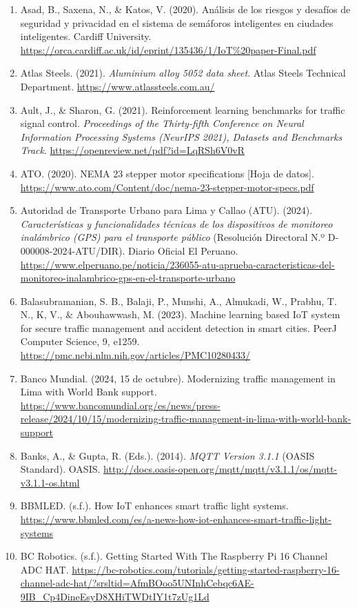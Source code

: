 \begin{enumerate}
\item
  Asad, B., Saxena, N., \& Katos, V. (2020). Análisis de los riesgos y desafíos de seguridad y privacidad en el sistema de semáforos inteligentes en ciudades inteligentes. Cardiff University. \url{https://orca.cardiff.ac.uk/id/eprint/135436/1/IoT%20paper-Final.pdf}
\item
  Atlas Steels. (2021). \emph{Aluminium alloy 5052 data sheet}. Atlas Steels Technical Department. \url{https://www.atlassteels.com.au/}
\item
  Ault, J., \& Sharon, G. (2021). Reinforcement learning benchmarks for traffic signal control. \emph{Proceedings of the Thirty-fifth Conference on Neural Information Processing Systems (NeurIPS 2021), Datasets and Benchmarks Track}. \url{https://openreview.net/pdf?id=LqRSh6V0vR}
\item
  ATO. (2020). NEMA 23 stepper motor specifications {[}Hoja de datos{]}. \url{https://www.ato.com/Content/doc/nema-23-stepper-motor-specs.pdf}
\item
  Autoridad de Transporte Urbano para Lima y Callao (ATU). (2024). \emph{Características y funcionalidades técnicas de los dispositivos de monitoreo inalámbrico (GPS) para el transporte público} (Resolución Directoral N.º D-000008-2024-ATU/DIR). Diario Oficial El Peruano. \url{https://www.elperuano.pe/noticia/236055-atu-aprueba-caracteristicas-del-monitoreo-inalambrico-gps-en-el-transporte-urbano}
\item
  Balasubramanian, S. B., Balaji, P., Munshi, A., Almukadi, W., Prabhu, T. N., K, V., \& Abouhawwash, M. (2023). Machine learning based IoT system for secure traffic management and accident detection in smart cities. PeerJ Computer Science, 9, e1259. \url{https://pmc.ncbi.nlm.nih.gov/articles/PMC10280433/}
\item
  Banco Mundial. (2024, 15 de octubre). Modernizing traffic management in Lima with World Bank support. \url{https://www.bancomundial.org/es/news/press-release/2024/10/15/modernizing-traffic-management-in-lima-with-world-bank-support}
\item
  Banks, A., \& Gupta, R. (Eds.). (2014). \emph{MQTT Version 3.1.1} (OASIS Standard). OASIS. \url{http://docs.oasis-open.org/mqtt/mqtt/v3.1.1/os/mqtt-v3.1.1-os.html}
\item
  BBMLED. (s.f.). How IoT enhances smart traffic light systems. \url{https://www.bbmled.com/es/a-news-how-iot-enhances-smart-traffic-light-systems}
\item
  BC Robotics. (s.f.). Getting Started With The Raspberry Pi 16 Channel ADC HAT. \url{https://bc-robotics.com/tutorials/getting-started-raspberry-16-channel-adc-hat/?srsltid=AfmBOoo5UNInhCebqc6AE-9IB_Cp4DineEsyD8XHiTWDtIY1t7zUg1Ld}

\end{enumerate}
